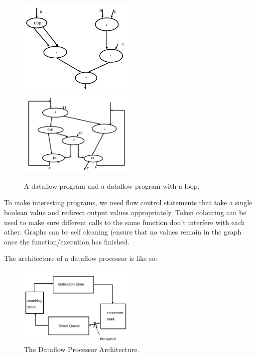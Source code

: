 \begin{figure}[H]
  \centering
  \includegraphics[width=0.5\textwidth]{diagrams/dataflow-prog}
  \includegraphics[width=0.5\textwidth]{diagrams/dataflow-loop}
  \caption{A dataflow program and a dataflow program with a loop.}
\end{figure}

To make interesting programs, we need flow control statements that
take a single boolean value and redirect output values
appropriately. Token colouring can be used to make sure different
calls to the same function don't interfere with each other. Graphs can
be self cleaning (ensure that no values remain in the graph once the
function/execution has finished.

The architecture of a dataflow processor is like so:

\begin{figure}[H]
  \centering
  \includegraphics[width=0.5\textwidth]{diagrams/dataflow-arch}
  \caption{The Dataflow Processor Architecture.}
\end{figure}

